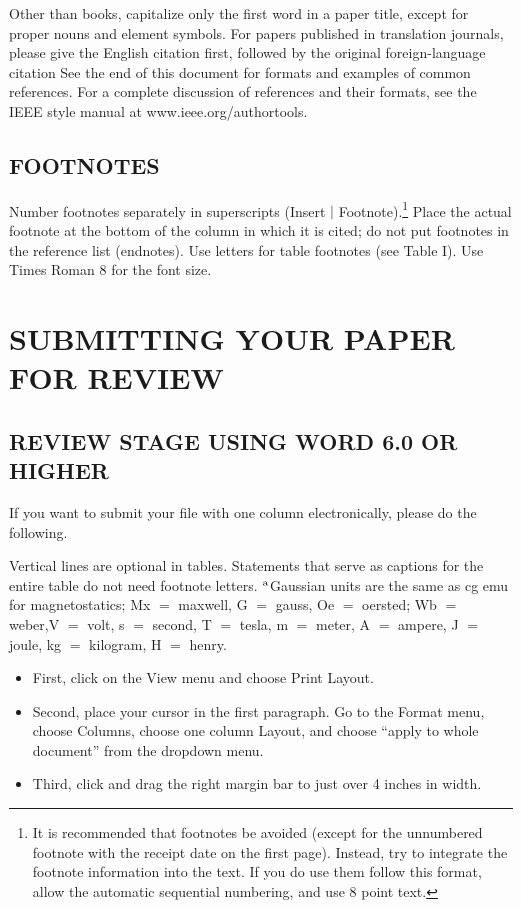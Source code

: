 \documentclass{IEEEjmw}
\begin{document}
Other than books, capitalize only the first word in a paper title, except for proper nouns and element symbols. For papers published in translation journals, please give the English citation first, followed by the original foreign-language citation See the end of this document for formats and examples of common references. For a complete discussion of references and their formats, see the IEEE style manual at www.ieee.org/authortools.

\subsection{FOOTNOTES}

Number footnotes separately in superscripts (Insert $|$ Footnote).\footnote{It is recommended that footnotes be avoided (except for the unnumbered footnote with the receipt date on the first page). Instead, try to integrate the footnote information into the text. If  you  do  use  them  follow  this format, allow the automatic sequential numbering, and use 8 point text.}  Place the actual footnote at the bottom of the column in which it is cited; do not put footnotes in the reference list (endnotes). Use letters for table footnotes (see Table I). Use Times Roman 8 for the font size.

\section{SUBMITTING YOUR PAPER FOR REVIEW}

\subsection{REVIEW STAGE USING WORD 6.0 OR HIGHER}

If you want to submit your file with one column electronically, please do the following.


Vertical lines  are  optional  in  tables.  Statements  that serve as captions for the entire table do not need footnote letters. $^{\scriptsize\textrm a}$Gaussian   units   are   the   same   as   cg   emu   for magnetostatics; Mx $=$ maxwell, G $=$ gauss, Oe $=$ oersted; Wb $=$ weber,\break V $=$ volt, s $=$ second, T $=$ tesla, m $=$ meter, A $=$ ampere, J $=$ joule, kg $=$ kilogram, H $=$ henry.\vspace*{-5pt}

\begin{itemize}
\item[--\kern-4pt$$]First, click on the View menu and choose Print Layout.

\item[--\kern-4pt]Second, place your cursor in the first paragraph. Go to the Format menu, choose Columns, choose one column Layout, and choose ``apply to whole document'' from the dropdown menu.

\item[--\kern-4pt]Third, click and drag the right margin bar to just over 4 inches in width.
\end{itemize}\vspace*{-5pt}
\end{document}
